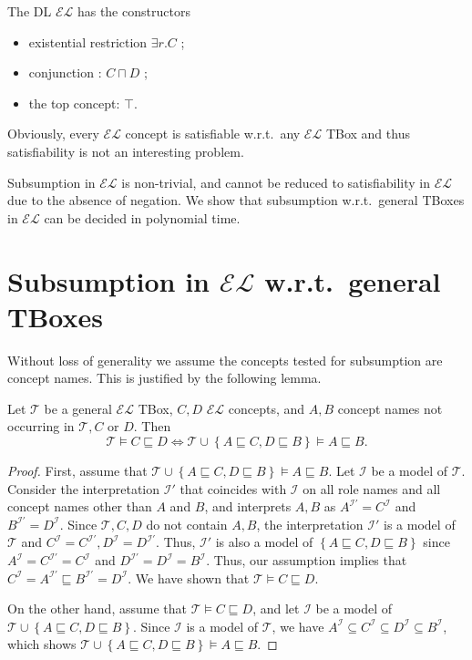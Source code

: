 The DL $\mathcal{EL}$ has the constructors
\begin{itemize}
	\item existential restriction $\exists r.C$ ;
	\item conjunction : $C \sqcap D$ ;
	\item the top concept: $\top$.
\end{itemize}
Obviously, every $\mathcal{EL}$ concept is satisfiable w.r.t.\ any $\mathcal{EL}$ TBox
and thus satisfiability is not an interesting problem.

Subsumption in $\mathcal{EL}$ is non-trivial, and cannot be reduced to satisfiability in $\mathcal{EL}$ due to the absence of negation.
We show that subsumption w.r.t.\ general TBoxes in $\mathcal{EL}$ can be decided in polynomial time.

\section{Subsumption in $\mathcal{EL}$ w.r.t.\ general TBoxes}
Without loss of generality we assume the concepts tested for subsumption are concept names.
This is justified by the following lemma.

\begin{lemma}
	Let $\mathcal{T}$ be a general $\mathcal{EL}$ TBox, $C,D$ $\mathcal{EL}$ concepts,
	and $A,B$ concept names not occurring in $\mathcal{T}, C$ or $D$.
	Then
	\[
	\mathcal{T} \vDash C \sqsubseteq D \iff \mathcal{T} \cup \left\{ A \sqsubseteq C, D \sqsubseteq B \right\} \vDash A \sqsubseteq B
	.\]
\end{lemma}
\begin{proof}
	First, assume that $\mathcal{T} \cup \left\{ A \sqsubseteq C, D \sqsubseteq B \right\} \vDash A \sqsubseteq B$.
	Let $\mathcal{I}$ be a model of $\mathcal{T}$.
	Consider the interpretation $\mathcal{I}'$ that coincides with $\mathcal{I}$ on all role names
	and all concept names other than  $A$ and $B$,
	and interprets $A,B$ as $A^{\mathcal{I}'} = C^\mathcal{I}$ and $B^{\mathcal{I}'} = D^\mathcal{I}$.
	Since $\mathcal{T}, C, D$ do not contain $A, B$,
	the interpretation $\mathcal{I}'$ is a model of $\mathcal{T}$ and
	$C^\mathcal{I} = C^{\mathcal{I}'}, D^{\mathcal{I}} = D^{\mathcal{I}'}$.
	Thus, $\mathcal{I}'$ is also a model of $\left\{ A \sqsubseteq C, D \sqsubseteq B \right\}$
	since $A^\mathcal{I} = C^{\mathcal{I}'} = C^\mathcal{I}$
	and $D^{\mathcal{I}'} = D^\mathcal{I} = B^\mathcal{I}$.
	Thus, our assumption implies that $C^\mathcal{I} = A^{\mathcal{I}'} \sqsubseteq B^{\mathcal{I}'} = D^\mathcal{I}$.
	We have shown that $\mathcal{T} \vDash C \sqsubseteq D$.

	On the other hand, assume that $\mathcal{T} \vDash C \sqsubseteq D$,
	and let $\mathcal{I}$ be a model of $\mathcal{T} \cup \left\{ A \sqsubseteq C, D \sqsubseteq B \right\}$.
	Since $\mathcal{I}$ is a model of $\mathcal{T}$, we have $A^\mathcal{I} \subseteq C^\mathcal{I} \subseteq D^\mathcal{I} \subseteq B^\mathcal{I}$,
	which shows $\mathcal{T} \cup \left\{ A \sqsubseteq C, D \sqsubseteq B \right\} \vDash A \sqsubseteq B$.
\end{proof}

